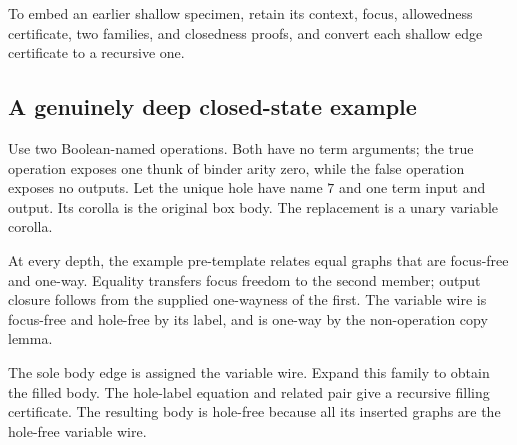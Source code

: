 To embed an earlier shallow specimen, retain its context, focus,
allowedness certificate, two families, and closedness proofs, and
convert each shallow edge certificate to a recursive one.

\subsection{A genuinely deep closed-state example}
Use two Boolean-named operations. Both have no term arguments; the
true operation exposes one thunk of binder arity zero, while the false
operation exposes no outputs. Let the unique hole have name $7$ and
one term input and output. Its corolla is the original box body.
The replacement is a unary variable corolla.

At every depth, the example pre-template relates equal graphs that
are focus-free and one-way. Equality transfers focus freedom to the
second member; output closure follows from the supplied one-wayness
of the first. The variable wire is focus-free and hole-free by its
label, and is one-way by the non-operation copy lemma.

The sole body edge is assigned the variable wire. Expand this family
to obtain the filled body. The hole-label equation and related pair
give a recursive filling certificate. The resulting body is hole-free
because all its inserted graphs are the hole-free variable wire.

